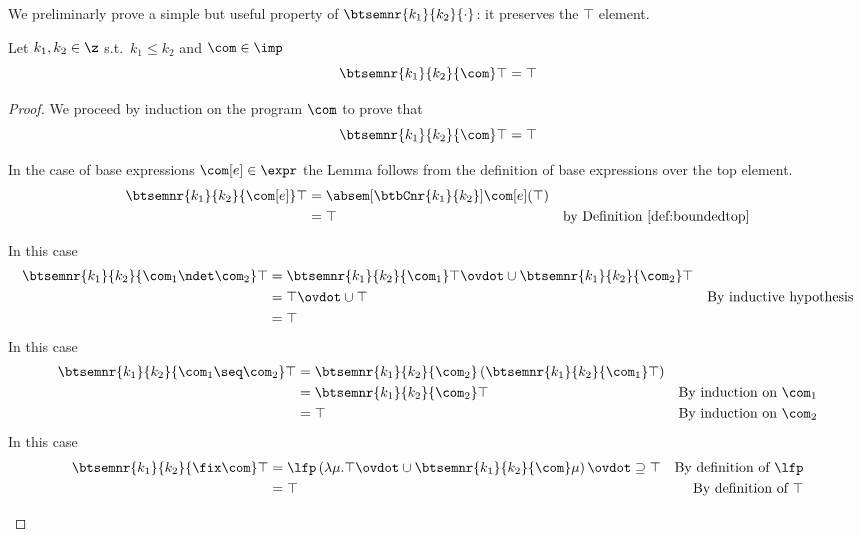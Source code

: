 We preliminarly prove a simple but useful property of
\(\btsemnr{k_1}{k_2}{\cdot}\): it preserves the \(\top\) element.

\begin{lemma}\label{le:btsemnrtop}
  Let \(k_1, k_2 \in \z\) s.t.\ \(k_1 \leq k_2\) and \(\com\in\imp\)
  \begin{equation*}
    \btsemnr{k_1}{k_2}{\com}\top = \top
  \end{equation*}
\end{lemma}

\begin{proof}
  We proceed by induction on the program \(\com\) to prove that
  \begin{equation*}
    \btsemnr{k_1}{k_2}{\com}\top = \top
  \end{equation*}
  \begin{inductive}
    \case{\(\com[e]\)} In the case of base expressions
    \(\com[e]\in\expr\) the Lemma follows from the definition of
    base expressions over the top element.
    \begin{align*}
      \btsemnr{k_1}{k_2}{\com[e]}\top & = \absem[\btbCnr{k_1}{k_2}]{\com[e]}(\top) \\
                                      & = \top & \text{by Definition~\ref{def:boundedtop}}
    \end{align*}

     In this case
    \begin{align*}
      \btsemnr{k_1}{k_2}{\com_1\ndet\com_2}\top & = \btsemnr{k_1}{k_2}{\com_1}\top \ovdot\cup \btsemnr{k_1}{k_2}{\com_2}\top \\
                                                & = \top \ovdot\cup \top & \text{By inductive hypothesis} \\
                                                & = \top
    \end{align*}
     In this case
    \begin{align*}
      \btsemnr{k_1}{k_2}{\com_1\seq\com_2}\top & = \btsemnr{k_1}{k_2}{\com_2}\left(\btsemnr{k_1}{k_2}{\com_1}\top\right) \\
                                               & = \btsemnr{k_1}{k_2}{\com_2}\top & \text{By induction on }\com_1 \\
                                               & = \top & \text{By induction on }\com_2
    \end{align*}
    \case{\(\fix\com\)} In this case
    \begin{align*}
      \btsemnr{k_1}{k_2}{\fix\com}\top & = \lfp\left(\lambda \mu . \top \ovdot\cup \btsemnr{k_1}{k_2}{\com}\mu\right) \ovdot\supseteq \top & \text{By definition of }\lfp \\
                                       & = \top & \text{By definition of }\top
    \end{align*}
  \end{inductive}
\end{proof}

